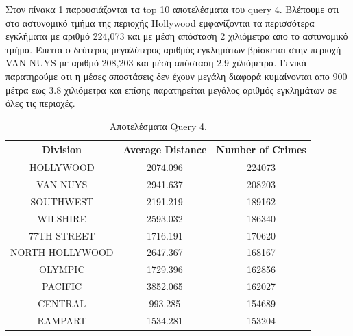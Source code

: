 \documentclass[12pt, a4paper]{article}
\begin{document}


Στον πίνακα \ref{q4_results_all} παρουσιάζονται τα top 10 αποτελέσματα του query 4. Βλέπουμε οτι
στο αστυνομικό τμήμα της περιοχής Hollywood εμφανίζονται τα περισσότερα εγκλήματα με αριθμό 
224,073 και με μέση απόσταση 2 χιλιόμετρα απο το αστυνομικό τμήμα. Έπειτα ο δεύτερος
μεγαλύτερος αριθμός εγκλημάτων βρίσκεται στην περιοχή VAN NUYS με αριθμό 208,203 και
μέση απόσταση 2.9 χιλιόμετρα. Γενικά παρατηρούμε οτι η μέσες σποστάσεις δεν έχουν μεγάλη διαφορά
κυμαίνονται απο 900 μέτρα εως 3.8 χιλιόμετρα και επίσης παρατηρείται μεγάλος αριθμός εγκλημάτων σε
όλες τις περιοχές.

\begin{table}[h]
\centering
\begin{tabular}{ccc} 
\hline
Division & Average Distance & Number of Crimes \\ 
\hline
HOLLYWOOD       & 2074.096        & 224073 \\
VAN NUYS        & 2941.637        & 208203 \\
SOUTHWEST       & 2191.219        & 189162 \\
WILSHIRE        & 2593.032        & 186340 \\
77TH STREET     & 1716.191        & 170620 \\
NORTH HOLLYWOOD & 2647.367        & 168167 \\
OLYMPIC         & 1729.396        & 162856 \\
PACIFIC         & 3852.065        & 162027 \\
CENTRAL         & 993.285         & 154689 \\
RAMPART         & 1534.281        & 153204 \\
\hline
\end{tabular}
\caption{Αποτελέσματα Query 4.}
\label{q4_results_all}
\end{table}
\end{document}
